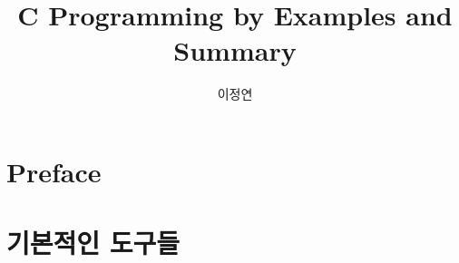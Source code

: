 \documentclass{report}
\title{C Programming by Examples and Summary}
\author{이정연}
\begin{document}
\begin{titlepage}
\maketitle  
\end{titlepage}

\chapter*{Preface}


\setcounter{chapter}{-1}
\chapter{기본적인 도구들}

\end{document}
